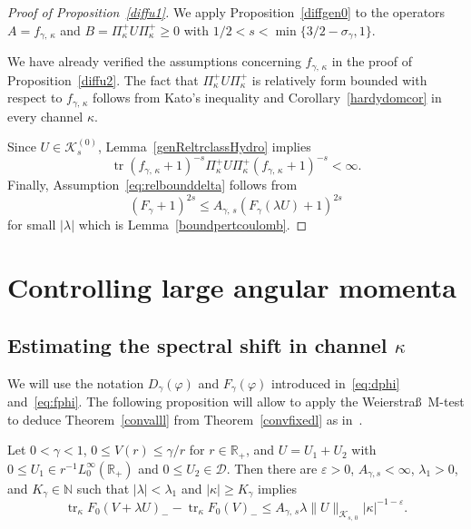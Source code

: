 \documentclass[AHL,Unicode,longabstracts,published]{cedram}
\DeclareMathOperator{\tr}{tr}
\newcommand*\nz{\mathbb{N}}
\newcommand*\rz{\mathbb{R}}
\newcommand*\cD{\mathcal{D}}
\newcommand*\cK{\mathcal{K}}
\newcommand*\ppp{\Pi^+_\kappa}
\begin{document}
\begin{proof}[Proof of Proposition~\ref{diffu1}]
We apply Proposition~\ref{diffgen0} to the operators $ A = f_{\gamma,\,\kappa}$ and $B =\ppp U \ppp\geq 0$ with $1/2<s<\min\{3/2-\sigma_\gamma,1\}$.

We have already verified the assumptions concerning $f_{\gamma,\,\kappa}$ in the proof of Proposition~\ref{diffu2}. The fact that $\ppp U\ppp$ is relatively form bounded with respect to $f_{\gamma,\,\kappa}$ follows from Kato's inequality and Corollary~\ref{hardydomcor} in every channel $\kappa$.

Since $U\in\cK_{s}^{(0)}$, Lemma~\ref{genReltrclassHydro} implies
\[
\tr\left(f_{\gamma,\,\kappa}+1\right)^{-s}\ppp U\ppp\left(f_{\gamma,\,\kappa}+1\right)^{-s}<\infty.
\]
Finally, Assumption~\eqref{eq:relbounddelta} follows from
\[
\left(F_\gamma+1\right)^{2s}\leq A_{\gamma,\,s}\left(F_{\gamma}(\lambda U)+1\right)^{2s}
\]
for small $|\lambda|$ which is Lemma~\ref{boundpertcoulomb}.
\end{proof}



\section{Controlling large angular momenta}\label{s:alll}

\subsection{Estimating the spectral shift in channel \texorpdfstring{$\kappa$}{kappa}}
We will use the notation $D_\gamma(\varphi)$ and $F_\gamma(\varphi)$ introduced in~\eqref{eq:dphi} and~\eqref{eq:fphi}. The following proposition will allow to apply the Weierstra\ss~M-test to deduce Theorem~\ref{convalll} from Theorem~\ref{convfixedl} as in~\cite{Franketal2020P}.

\begin{prop}\label{dominantsigma}
Let $0<\gamma<1$, $0\leq V(r)\leq\gamma/r$ for $r\in\rz_+$, and $U=U_1+U_2$ with $0\leq U_1\in r^{-1}L^\infty_0 (\rz_+)$ and $0\leq U_2\in\cD$. Then there are $\varepsilon>0$, $A_{\gamma,s}<\infty$, $\lambda_1>0$, and $K_\gamma\in\nz$ such that $|\lambda|<\lambda_1$ and $|\kappa|\geq K_\gamma$ implies
\begin{equation}
\tr_\kappa F_0(V+\lambda U)_- -\tr_\kappa F_0(V)_-
\leq A_{\gamma,\,s}\lambda \|U\|_{\cK_{s,\,0}} |\kappa|^{-1-\varepsilon}.
\end{equation}
\end{prop}
\end{document}
